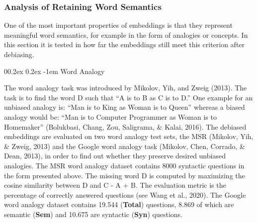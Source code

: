 \documentclass[
  english,
  man,floatsintext]{apa6}
\makeatletter
\let\oldparagraph\paragraph
\renewcommand{\paragraph}[1]{\oldparagraph{#1}\mbox{}}
\renewcommand{\paragraph}{\@startsection{paragraph}{4}{\parindent}%
  {0\baselineskip \@plus 0.2ex \@minus 0.2ex}%
  {-1em}%
  {\normalfont\normalsize\bfseries\itshape\typesectitle}}
\makeatother
\begin{document}
\hypertarget{analysis-of-retaining-word-semantics}{%
\subsubsection{Analysis of Retaining Word Semantics}\label{analysis-of-retaining-word-semantics}}

One of the most important properties of embeddings is that they represent meaningful word semantics, for example in the form of analogies or concepts. In this section it is tested in how far the embeddings still meet this criterion after debiasing.

\hypertarget{word-analogy}{%
\paragraph{Word Analogy}\label{word-analogy}}

The word analogy task was introduced by Mikolov, Yih, and Zweig (2013). The task is to find the word D such that ``A is to B as C is to D.'' One example for an unbiased analogy is: ``Man is to King as Woman is to Queen'' whereas a biased analogy would be: ``Man is to Computer Programmer as Woman is to Homemaker'' (Bolukbasi, Chang, Zou, Saligrama, \& Kalai, 2016). The debiased embeddings are evaluated on two word analogy test sets, the MSR (Mikolov, Yih, \& Zweig, 2013) and the Google word analogy task (Mikolov, Chen, Corrado, \& Dean, 2013), in order to find out whether they preserve desired unbiased analogies.
The MSR word analogy dataset contains 8000 syntactic questions in the form presented above. The missing word D is computed by maximizing the cosine similarity between D and C - A + B. The evaluation metric is the percentage of correctly answered questions (see Wang et al., 2020).
The Google word analogy dataset contains 19.544 (\textbf{Total}) questions, 8.869 of which are semantic (\textbf{Sem}) and 10.675 are syntactic (\textbf{Syn}) questions.
\end{document}
